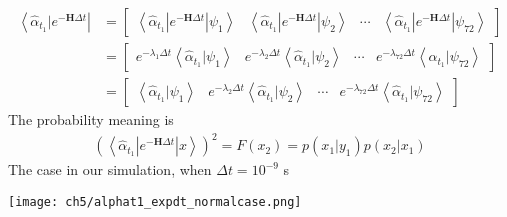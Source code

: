 \begin{definition}
\begin{align*}
        \left< \hat{\alpha}_{t_1}| e^{-\textbf{H}\Delta t} \right| &= 
        \begin{bmatrix}
                \left< \hat{\alpha}_{t_1}| e^{-\textbf{H}\Delta t} | \psi_1 \right> &
                \left< \hat{\alpha}_{t_1}| e^{-\textbf{H}\Delta t} | \psi_2 \right> & 
                \cdots &
                \left< \hat{\alpha}_{t_1}| e^{-\textbf{H}\Delta t} | \psi_{72} \right>
        \end{bmatrix}\\
        &=
        \begin{bmatrix}
                e^{-\lambda_{1}\Delta t} \left< \hat{\alpha}_{t_1} | \psi_1 \right> &
                e^{-\lambda_{2}\Delta t} \left< \hat{\alpha}_{t_1} | \psi_2 \right> & 
                \cdots &
                e^{-\lambda_{72}\Delta t} \left< \hat{\alpha}_{t_1} | \psi_{72} \right> 
        \end{bmatrix}\\ 
        &=
        \begin{bmatrix}
                \left< \hat{\alpha}_{t_1} | \psi_1 \right> &
                e^{-\lambda_{2}\Delta t} \left< \hat{\alpha}_{t_1} | \psi_2 \right> & 
                \cdots &
                e^{-\lambda_{72}\Delta t} \left< \hat{\alpha}_{t_1} | \psi_{72} \right> 
        \end{bmatrix}
\end{align*}
The probability meaning is 
\begin{align*}
        (\left< \hat{\alpha}_{t_1}| e^{-\textbf{H}\Delta t} | x \right>)^2 = F(x_2) = p(x_1|y_1) p(x_2|x_1) 
\end{align*}
The case in our simulation, when $\Delta t = 10^{-9}$ s 
\begin{center}
        \texttt{[image: ch5/alphat1\_expdt\_normalcase.png]}   
\end{center}
\end{definition}


